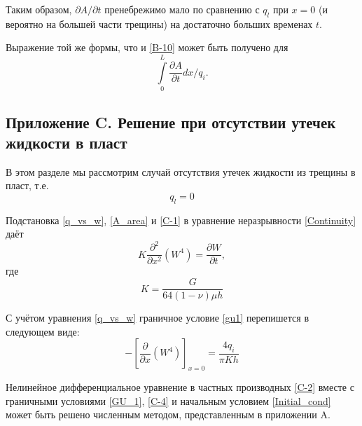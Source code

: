 \documentclass[a4paper, 11pt]{article}
\newcommand{\beq}{\begin{equation}}
\newcommand{\eeq}{\end{equation}}
\begin{document}
Таким образом, $\partial A/\partial t$ пренебрежимо мало по сравнению с $q_l$ при $x=0$ (и вероятно на большей части трещины) на достаточно больших временах $t$.

Выражение той же формы, что и \eqref{B-10} может быть получено для
$$
\int\limits_{0}^{L}{\frac{\partial A}{\partial t}dx/q_i}.
$$

\subsection{Приложение C. Решение при отсутствии утечек жидкости в пласт}

В этом разделе мы рассмотрим случай отсутствия утечек жидкости из трещины в пласт, т.е.
\beq\label{C-1}
q_l=0
\tag{C-1}
\eeq

Подстановка \eqref{q_vs_w}, \eqref{A_area} и \eqref{C-1} в уравнение неразрывности \eqref{Continuity} даёт
\beq\label{C-2}
K\frac{\partial^2}{\partial x^2}\left(W^4\right)=\frac{\partial W}{\partial t},
\tag{C-2}
\eeq
где
\beq\label{C-3}
K=\frac{G}{64(1-\nu)\mu h}
\tag{C-3}
\eeq

С учётом уравнения \eqref{q_vs_w} граничное условие \eqref{gu1} перепишется в следующем виде:
\beq\label{C-4}
-\left[\frac{\partial}{\partial x}\left(W^4\right)\right]_{x=0}=\frac{4q_i}{\pi Kh}
\tag{C-4}
\eeq

Нелинейное дифференциальное уравнение в частных производных \eqref{C-2} вместе с граничными условиями \eqref{GU_1}, \eqref{C-4} и начальным условием \eqref{Initial_cond} может быть решено численным методом, представленным в приложении A.
\end{document}
